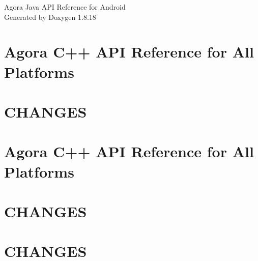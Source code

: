 \let\mypdfximage\pdfximage\def\pdfximage{\immediate\mypdfximage}\documentclass[twoside]{book}
\newcommand{\+}{\discretionary{\mbox{\scriptsize$\hookleftarrow$}}{}{}}
\newcommand{\clearemptydoublepage}{%
  \newpage{\pagestyle{empty}\cleardoublepage}%
}
\begin{document}
\hypersetup{pageanchor=false,
             bookmarksnumbered=true,
             pdfencoding=unicode
            }
\begin{titlepage}
\vspace*{7cm}
\begin{center}%
{\Large Agora Java A\+PI Reference for Android }\\
\vspace*{1cm}
{\large Generated by Doxygen 1.8.18}\\
\end{center}
\end{titlepage}
\clearemptydoublepage
{}
\tableofcontents
\clearemptydoublepage
{}
\hypersetup{pageanchor=true}

\chapter{Agora C++ A\+PI Reference for All Platforms}
\label{index}\hypertarget{index}{}
\chapter{C\+H\+A\+N\+G\+ES}
\label{md__tmp_jenkins_media_sdk_script_rte_sdk_interface_cpp_api2__c_h_a_n_g_e_s}

\chapter{Agora C++ A\+PI Reference for All Platforms}
\label{md__tmp_jenkins_media_sdk_script_rte_sdk_interface_cpp_api2_mainpage_linux_rtc}

\chapter{C\+H\+A\+N\+G\+ES}
\label{md__tmp_jenkins_media_sdk_script_rte_sdk_interface_cpp_base__c_h_a_n_g_e_s}

\chapter{C\+H\+A\+N\+G\+ES}
\label{md__tmp_jenkins_media_sdk_script_rte_sdk_interface_cpp_rtc_engine__c_h_a_n_g_e_s}

\end{document}
